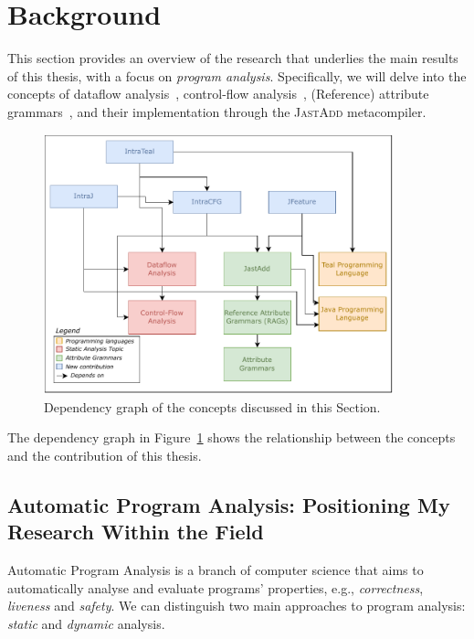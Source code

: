 \section{Background}%
\label{sec:background}
This section provides an overview of the research that underlies the main results
of this thesis, with a focus on \emph{program analysis}. Specifically, we will delve into
the concepts of dataflow analysis~\cite{aho2007compilers,Nielson2010Principles},
control-flow analysis~\cite{allen1970control}, (Reference) attribute grammars~\cite{knuth1968semantics, DBLP:journals/informaticaSI/Hedin00},
and their implementation through the \textsc{JastAdd} metacompiler.

\usetikzlibrary{backgrounds}
\begin{figure}[h]
    \centering
    \includegraphics[width=0.9\textwidth]{kappa/img/Dependencies.pdf}
  \caption{\label{fig:dependencygraph}Dependency graph of the concepts discussed in this Section.}
\end{figure}
The dependency graph in Figure~\ref{fig:dependencygraph} shows the relationship between
the concepts and the contribution of this thesis.

\subsection{Automatic Program Analysis: Positioning My Research Within the Field}
Automatic Program Analysis is a branch of computer science that aims to automatically
analyse and evaluate programs' properties, e.g., \emph{correctness}, \emph{liveness} and \emph{safety}. We can distinguish two main
approaches to program analysis: \emph{static} and \emph{dynamic} analysis.


